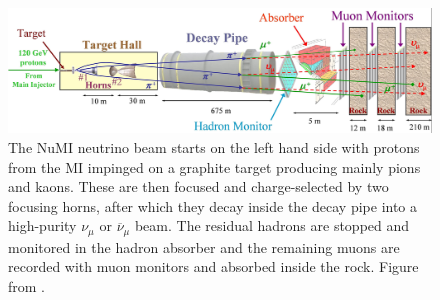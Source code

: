 \begin{figure}[!hbtp]
\centering
\includegraphics[width=\textwidth]{Plots/NOvAExperiment/BeamlineAlternative.jpg}
\caption[The schematic of the NuMI beam facility]{
The \acrshort{NuMI} neutrino beam starts on the left hand side with protons from the \acrshort{MI} impinged on a graphite target producing mainly pions and kaons. These are then focused and charge-selected by two focusing horns, after which they decay inside the decay pipe into a high-purity $\nu_\mu$ or $\overline{\nu}_\mu$ beam. The residual hadrons are stopped and monitored in the hadron absorber and the remaining muons are recorded with muon monitors and absorbed inside the rock. Figure from \cite{NuMI.pdf}.
}
\label{fig:NOvANuMI}
\end{figure}

